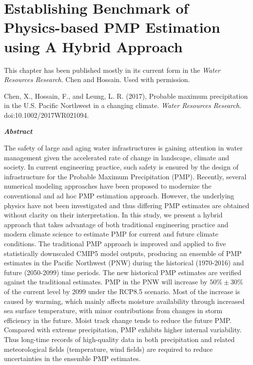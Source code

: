 \chapter {Establishing Benchmark of Physics-based PMP Estimation using A Hybrid Approach}
\label{ch:WRR}



This chapter has been published mostly in its current form in the \textit{Water Resources Research}. \textcopyright Chen and Hossain. Used with permission.\\

\bigbreak

\noindent
{}
\setlength{\hangindent}{2em}
Chen, X., Hossain, F., and Leung, L. R. (2017), Probable maximum precipitation in the U.S. Pacific Northwest in a changing climate. \textit{Water Resources Research}. doi:10.1002/2017WR021094.

\vspace{10mm}

\noindent
\textit{\textbf{Abstract}}
 
The safety of large and aging water infrastructures is gaining attention in water management given the accelerated rate of change in landscape, climate and society. In current engineering practice, such safety is ensured by the design of infrastructure for the Probable Maximum Precipitation (PMP). Recently, several numerical modeling approaches have been proposed to modernize the conventional and ad hoc PMP estimation approach. However, the underlying physics have not been investigated and thus differing PMP estimates are obtained without clarity on their interpretation. In this study, we present a hybrid approach that takes advantage of both traditional engineering practice and modern climate science to estimate PMP for current and future climate conditions. The traditional PMP approach is improved and applied to five statistically downscaled CMIP5 model outputs, producing an ensemble of PMP estimates in the Pacific Northwest (PNW) during the historical (1970-2016) and future (2050-2099) time periods. The new historical PMP estimates are verified against the traditional estimates. PMP in the PNW will increase by $50\%\pm30\%$ of the current level by 2099 under the RCP8.5 scenario. Most of the increase is caused by warming, which mainly affects moisture availability through increased sea surface temperature, with minor contributions from changes in storm efficiency in the future. Moist track change tends to reduce the future PMP. Compared with extreme precipitation, PMP exhibits higher internal variability. Thus long-time records of high-quality data in both precipitation and related meteorological fields (temperature, wind fields) are required to reduce uncertainties in the ensemble PMP estimates.

